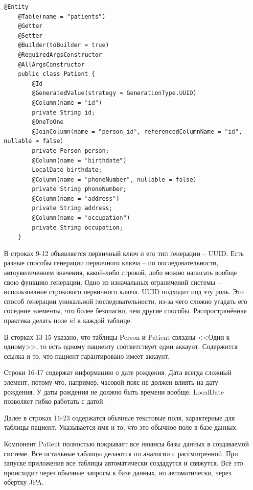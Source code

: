 \documentclass[a4paper,article]{article}
\begin{document}
\begin{sloppypar}
    \begin{lstlisting}[label=jpapatient,caption=Пример реализации таблицы Patient через JPA]
    @Entity
    @Table(name = "patients")
    @Getter
    @Setter
    @Builder(toBuilder = true)
    @RequiredArgsConstructor
    @AllArgsConstructor
    public class Patient {
        @Id
        @GeneratedValue(strategy = GenerationType.UUID)
        @Column(name = "id")
        private String id;
        @OneToOne
        @JoinColumn(name = "person_id", referencedColumnName = "id", nullable = false)
        private Person person;
        @Column(name = "birthdate")
        LocalDate birthdate;
        @Column(name = "phoneNumber", nullable = false)
        private String phoneNumber;
        @Column(name = "address")
        private String address;
        @Column(name = "occupation")
        private String occupation;
    }
    \end{lstlisting}

    В строках 9-12 объявляется первичный ключ и его тип генерации -- UUID. Есть разные способы генерации первичного ключа -- по последовательности, автоувеличением значения, какой-либо строкой, либо можно написать вообще свою функцию генерации. Одно из изначальных ограничений системы -- использование строкового первичного ключа. UUID подходит под эту роль. Это способ генерации уникальной последовательности, из-за чего сложно угадать его соседние элементы, что более безопасно, чем другие способы. Распространённая практика делать поле id в каждой таблице.

    В сторках 13-15 указано, что таблицы Person и Patient связаны <<Один к одному>>, то есть одному пациенту соответствует один аккаунт. Содержится ссылка и то, что пациент гарантировано имеет аккаунт.

    Строки 16-17 содержат информацию о дате рождения. Дата всегда сложный элемент, потому что, например, часовой пояс не должен влиять на дату рождения. У даты рождения не должно быть времени вообще. LocalDate позволяет гибко работать с датой.

    Далее в строках 16-23 содержатся обычные текстовые поля, характерные для таблицы пациент. Указывается имя и то, что это обычное поле в базе данных.

    Компонент Patient полностью покрывает все нюансы базы данных в создаваемой системе. Все остальные таблицы делаются по аналогии с рассмотренной. При запуске приложения все таблицы автоматически создадутся и свяжутся. Всё это происходит через обычные запросы к базе данных, но автоматически, через обёртку JPA.


\end{sloppypar}
\end{document}
